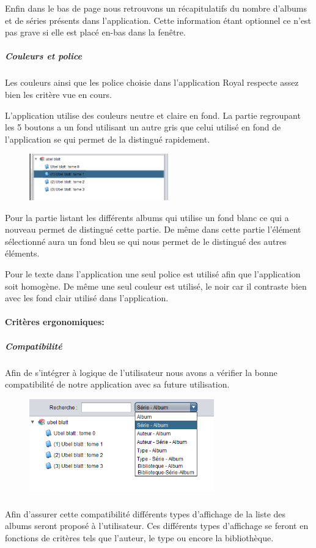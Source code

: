 \documentclass[etudiants]{support-iutrs}
\begin{document}
Enfin dans le bas de page nous retrouvons un récapitulatifs du nombre d'albums et de séries présents dans l'application.
Cette information étant optionnel ce n'est pas grave si elle est placé en-bas dans la fenêtre.

\subparagraph{Couleurs et police}
Les couleurs ainsi que les police choisie dans l'application Royal respecte assez bien les critère vue en cours.

L'application utilise des couleurs neutre et claire en fond. 
La partie regroupant les 5 boutons a un fond utilisant un autre gris que celui utilisé en fond de l'application se qui permet de la distingué rapidement. 
\begin{figure}
\includegraphics[width=6cm]{img/app_pc_maquette_elmt_selec.png}
\end{figure}

Pour la partie listant les différents albums qui utilise un fond blanc ce qui a nouveau permet de distingué cette partie. 
De même dans cette partie l'élément sélectionné aura un fond bleu se qui nous permet de le distingué des autres éléments.  

Pour le texte dans l'application une seul police est utilisé afin que l'application soit homogène. 
De même une seul couleur est utilisé, le noir car il contraste bien avec les fond clair utilisé dans l'application.  

\paragraph{Critères ergonomiques:}
\subparagraph{Compatibilité} Afin de s'intégrer à logique de l’utilisateur nous avons a vérifier la bonne compatibilité de notre application avec sa future utilisation.
  
\begin{figure}
\includegraphics[width=8cm]{img/app_pc_maquette_lst.png}
\end{figure}\subparagraph{}
\subparagraph{}
Afin d'assurer cette compatibilité différents types d'affichage de la liste des albums seront proposé à l'utilisateur.
Ces différents types d'affichage se feront en fonctions de critères tels que l'auteur, le type ou encore la bibliothèque.
\end{document}
